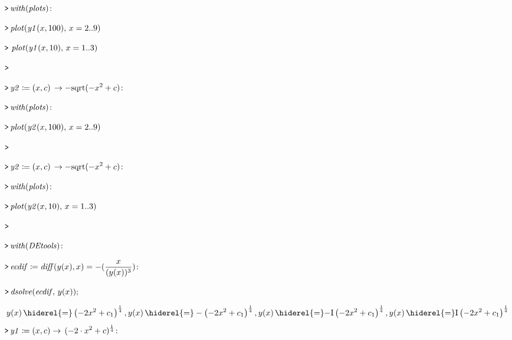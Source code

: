 \documentclass{article}
\begin{document}
\mapleinput
{$ \displaystyle \texttt{>\,} \mathit{with} (\mathit{plots})\colon  $}

\mapleinput
{$ \displaystyle \texttt{>\,} \mathit{plot} (\mathit{y1} (x ,100),\,x =2..9) $}

{}
\mapleinput
{$ \displaystyle \texttt{>\,} \,\mathit{plot} (\mathit{y1} (x ,10),\,x =1..3) $}

{}
\mapleinput
{$ \displaystyle \texttt{>\,} \, $}

\mapleinput
{$ \displaystyle \texttt{>\,} \mathit{y2} \coloneqq (x ,c)\,\rightarrow -\mathrm{sqrt}(-x^{2}+c)\colon  $}

\mapleinput
{$ \displaystyle \texttt{>\,} \mathit{with} (\mathit{plots})\colon  $}

\mapleinput
{$ \displaystyle \texttt{>\,} \mathit{plot} (\mathit{y2} (x ,100),\,x =2..9) $}

{}
\mapleinput
{$ \displaystyle \texttt{>\,} \, $}

\mapleinput
{$ \displaystyle \texttt{>\,} \mathit{y2} \coloneqq (x ,c)\,\rightarrow -\mathrm{sqrt}(-x^{2}+c)\colon  $}

\mapleinput
{$ \displaystyle \texttt{>\,} \mathit{with} (\mathit{plots})\colon  $}

\mapleinput
{$ \displaystyle \texttt{>\,} \mathit{plot} (\mathit{y2} (x ,10),\,x =1..3) $}

{}
\mapleinput
{$ \displaystyle \texttt{>\,} \, $}

\mapleinput
{$ \displaystyle \texttt{>\,} \mathit{with} (\mathit{DEtools})\colon  $}

\mapleinput
{$ \displaystyle \texttt{>\,} \mathit{ecdif} \coloneqq \mathit{diff} (y (x),x)=-(\frac{x}{(y (x))^{3}})\colon  $}

\mapleinput
{$ \displaystyle \texttt{>\,} \mathit{dsolve} (\mathit{ecdif} ,\,y (x)); $}

\begin{dmath}\label{(5)}
y \! \left(x \right) \hiderel{=} \left(-2 x^{2}+c_{1}\right)^{\frac{1}{4}},y \! \left(x \right) \hiderel{=} -\left(-2 x^{2}+c_{1}\right)^{\frac{1}{4}},
\\
y \! \left(x \right)\hiderel{=}\mathrm{-I} \left(-2 x^{2}+c_{1}\right)^{\frac{1}{4}},y \! \left(x \right) \hiderel{=} \mathrm{I} \left(-2 x^{2}+c_{1}\right)^{\frac{1}{4}}
\end{dmath}
\mapleinput
{$ \displaystyle \texttt{>\,} \mathit{y1} \coloneqq (x ,c)\rightarrow \,(-2\cdot x^{2}+c)^{\frac{1}{4}}\colon  $}
\end{document}
